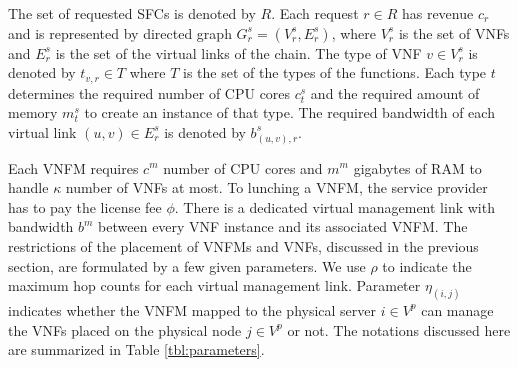 The set of requested SFCs is denoted by \(R\).
Each request \(r \in R\) has revenue \(c_r\) and
is represented by directed graph \(G^s_r = (V^s_r, E^s_r)\),
where \(V^s_r\) is the set of VNFs and \(E^s_r\) is the set of the virtual links of the chain.
The type of VNF \(v \in V^s_r\) is denoted by \(t_{v,r} \in T\) where \(T\) is the set of the types of the functions.
Each type \(t\) determines the required number of CPU cores \(c^s_t\)
and the required amount of memory \(m^s_t\) to create an instance of that type.
The required bandwidth of each virtual link \((u,v) \in E^s_r\) is denoted by \(b^s_{(u,v),r}\).

Each VNFM requires \(c^m\) number of CPU cores and \(m^m\) gigabytes of RAM to handle \(\kappa\) number of VNFs at most. To lunching a VNFM, the service provider has to pay the license fee \(\phi\).
There is a dedicated virtual management link with bandwidth \(b^m\) between every VNF instance and its associated VNFM.
The restrictions of the placement of VNFMs and VNFs, discussed in the previous section, are formulated by a few given parameters.
We use \(\rho\) to indicate the maximum hop counts for each virtual management link. Parameter \(\eta_{(i, j)}\) indicates whether the VNFM mapped to the physical server \(i \in V^p\) can manage the VNFs placed on the physical node \(j \in V^p\) or not. 
The notations discussed here are summarized in Table \ref{tbl:parameters}.

